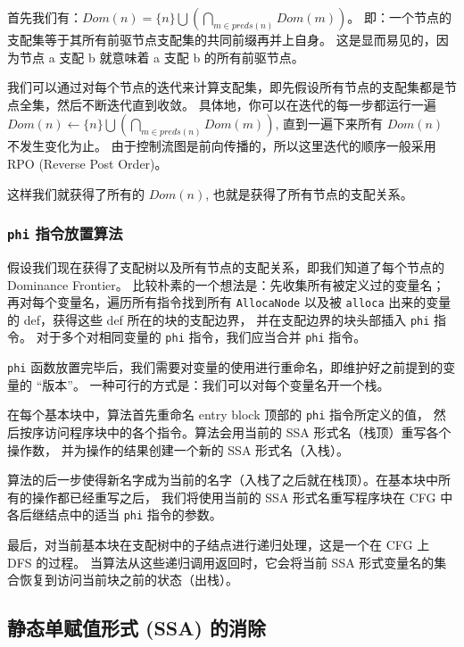 首先我们有：$\mathit{Dom}(n) = \{n\} \bigcup \left(\bigcap_{m\in \mathit{preds}(n)} \mathit{Dom}(m)\right)$。
即：一个节点的支配集等于其所有前驱节点支配集的共同前缀再并上自身。
这是显而易见的，因为节点 a 支配 b 就意味着 a 支配 b 的所有前驱节点。

我们可以通过对每个节点的迭代来计算支配集，即先假设所有节点的支配集都是节点全集，然后不断迭代直到收敛。
具体地，你可以在迭代的每一步都运行一遍 $\mathit{Dom}(n) \leftarrow \{n\} \bigcup
\left(\bigcap_{m\in \mathit{preds}(n)} \mathit{Dom}(m)\right)$,
直到一遍下来所有 $\mathit{Dom}(n)$ 不发生变化为止。
由于控制流图是前向传播的，所以这里迭代的顺序一般采用 RPO (Reverse Post Order)。

这样我们就获得了所有的 $\mathit{Dom}(n)$, 也就是获得了所有节点的支配关系。

\subsubsection{\texttt{phi} 指令放置算法}

假设我们现在获得了支配树以及所有节点的支配关系，即我们知道了每个节点的 Dominance Frontier。
比较朴素的一个想法是：先收集所有被定义过的变量名；再对每个变量名，遍历所有指令找到所有 \texttt{AllocaNode}
以及被 \texttt{alloca} 出来的变量的 def，获得这些 def 所在的块的支配边界，
并在支配边界的块头部插入 \texttt{phi} 指令。
对于多个对相同变量的 \texttt{phi} 指令，我们应当合并 \texttt{phi} 指令。

\texttt{phi} 函数放置完毕后，我们需要对变量的使用进行重命名，即维护好之前提到的变量的 “版本”。
一种可行的方式是：我们可以对每个变量名开一个栈。

在每个基本块中，算法首先重命名 entry block 顶部的 \texttt{phi} 指令所定义的值，
然后按序访问程序块中的各个指令。算法会用当前的 SSA 形式名（栈顶）重写各个操作数，
并为操作的结果创建一个新的 SSA 形式名（入栈）。

算法的后一步使得新名字成为当前的名字（入栈了之后就在栈顶）。在基本块中所有的操作都已经重写之后，
我们将使用当前的 SSA 形式名重写程序块在 CFG 中各后继结点中的适当 \texttt{phi} 指令的参数。

最后，对当前基本块在支配树中的子结点进行递归处理，这是一个在 CFG 上 DFS 的过程。
当算法从这些递归调用返回时，它会将当前 SSA 形式变量名的集合恢复到访问当前块之前的状态（出栈）。

\subsection{静态单赋值形式 (SSA) 的消除} \label{SSA-eliminate-phi}

